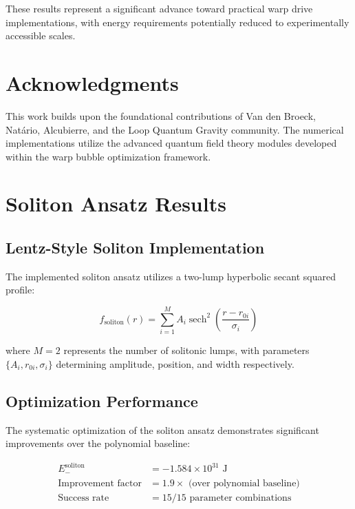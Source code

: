 \documentclass[12pt,a4paper]{article}
\begin{document}
These results represent a significant advance toward practical warp drive implementations, with energy requirements potentially reduced to experimentally accessible scales.

\section*{Acknowledgments}

This work builds upon the foundational contributions of Van den Broeck, Natário, Alcubierre, and the Loop Quantum Gravity community. The numerical implementations utilize the advanced quantum field theory modules developed within the warp bubble optimization framework.

\section{Soliton Ansatz Results}

\subsection{Lentz-Style Soliton Implementation}

The implemented soliton ansatz utilizes a two-lump hyperbolic secant squared profile:

\begin{equation}
f_{\text{soliton}}(r) = \sum_{i=1}^{M} A_i \operatorname{sech}^2\left(\frac{r - r_{0i}}{\sigma_i}\right)
\end{equation}

where $M = 2$ represents the number of solitonic lumps, with parameters $\{A_i, r_{0i}, \sigma_i\}$ determining amplitude, position, and width respectively.

\subsection{Optimization Performance}

The systematic optimization of the soliton ansatz demonstrates significant improvements over the polynomial baseline:

\begin{align}
E_{-}^{\text{soliton}} &= -1.584 \times 10^{31} \text{ J} \\
\text{Improvement factor} &= 1.9 \times \text{ (over polynomial baseline)} \\
\text{Success rate} &= 15/15 \text{ parameter combinations}
\end{align}
\end{document}
